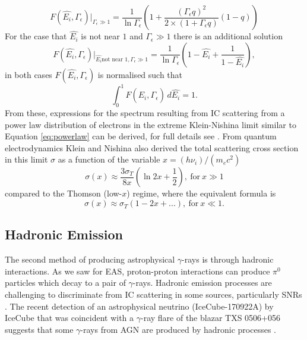 \begin{equation}
    F(\hat{E_i},\Gamma_{\epsilon}) \bigg|_{\Gamma_{\epsilon}\gg 1}=\frac{1}{\ln \Gamma_{\epsilon}}\left(1+\frac{(\Gamma_{\epsilon}q)^2}{2\times(1+\Gamma_{\epsilon}q)}(1-q) \right)
\end{equation}
For the case that $\hat{E_i}$ is not near $1$ and $\Gamma_{\epsilon}\gg1$ there is an additional solution
\begin{equation}
F(\hat{E_i},\Gamma_{\epsilon}) \bigg|_{\hat{E_i} \textrm{not near 1},\Gamma_{\epsilon}\gg1}=\frac{1}{\ln \Gamma_{\epsilon}}\left(1-\hat{E_i}+\frac{1}{1-\hat{E_i}}\right),
\end{equation}
in both cases $F(\hat{E_i},\Gamma_{\epsilon})$ is normalised such that
\begin{equation}
    \int_0^1 F(\hat{E_i},\Gamma_{\epsilon})\, d \hat{E_i} =1.
    \label{eq:norm}
\end{equation}
From these, expressions for the spectrum resulting from IC scattering from a power law distribution of electrons in the extreme Klein-Nishina limit similar to Equation \ref{eq:powerlaw} can be derived, for full details see \cite{blumenthal}. From quantum electrodynamics Klein and Nishina \cite{KN} also derived the total scattering cross section in this limit $\sigma$ as a function of the variable $x=(h\nu_i)/(m_ec^2)$
\begin{equation}
    \sigma(x) \approx \frac{3\sigma_T}{8x}\left(\ln 2x+\frac{1}{2}\right),\ \mathrm{for}\ x\gg1
    \label{eq:KNcrosssection}
\end{equation}
compared to the Thomson (low-$x$) regime, where the equivalent formula is
\begin{equation}
\sigma(x)\approx\sigma_T(1-2x+...),\ \mathrm{for}\ x\ll1.
\end{equation}
\subsection{Hadronic Emission}
The second method of producing astrophysical $\gamma$-rays is through hadronic interactions. As we saw for EAS, proton-proton interactions can produce $\pi^0$ particles which decay to a pair of $\gamma$-rays. Hadronic emission processes are challenging to discriminate from IC scattering in some sources, particularly SNRs \cite{rxjcta}. The recent detection of an astrophysical neutrino (IceCube-170922A) by IceCube that was coincident with a $\gamma$-ray flare of the blazar TXS 0506+056 suggests that some $\gamma$-rays from AGN are produced by hadronic processes \cite{TXS}. 

